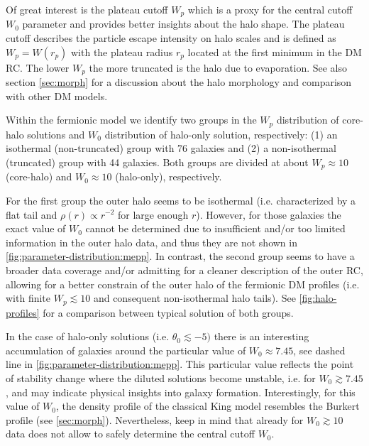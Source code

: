 Of great interest is the plateau cutoff $W_p$ which is a proxy for the central cutoff $W_0$ parameter and provides better insights about the halo shape. The plateau cutoff describes the particle escape intensity on halo scales and is defined as $W_p = W(r_p)$ with the plateau radius $r_p$ located at the first minimum in the DM RC. The lower $W_p$ the more truncated is the halo due to evaporation. See also section \ref{sec:morph} for a discussion about the halo morphology and comparison with other DM models.

Within the fermionic model we identify two groups in the $W_p$ distribution of core-halo solutions and $W_0$ distribution of halo-only solution, respectively: (1) an isothermal (non-truncated) group with 76 galaxies and (2) a non-isothermal (truncated) group with 44 galaxies. Both groups are divided at about $W_p \approx 10$ (core-halo) and $W_0 \approx 10$ (halo-only), respectively.

For the first group the outer halo seems to be isothermal (i.e. characterized by a flat tail and $\rho(r) \propto r^{-2}$ for large enough $r$). However, for those galaxies the exact value of $W_0$ cannot be determined due to insufficient and/or too limited information in the outer halo data, and thus they are not shown in \cref{fig:parameter-distribution:mepp}. In contrast, the second group seems to have a broader data coverage and/or admitting for a cleaner description of the outer RC, allowing for a better constrain of the outer halo of the fermionic DM profiles (i.e. with finite $W_p \lesssim 10$ and consequent non-isothermal halo tails). See \cref{fig:halo-profiles} for a comparison between typical solution of both groups.

In the case of halo-only solutions (i.e. $\theta_0 \lesssim -5)$ there is an interesting accumulation of galaxies around the particular value of $W_0 \approx 7.45$, see dashed line in \cref{fig:parameter-distribution:mepp}. This particular value reflects the point of stability change where the diluted solutions become unstable, i.e. for $W_0 \gtrsim 7.45$ \citep{2015PhRvD..91f3531C}, and may indicate physical insights into galaxy formation. Interestingly, for this value of $W_0$, the density profile of the classical King model resembles the Burkert profile (see \ref{sec:morph}). Nevertheless, keep in mind that already for $W_0 \gtrsim 10$ data does not allow to safely determine the central cutoff $W_0$.

